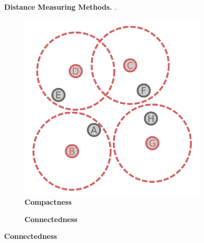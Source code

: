 \begin{figure}
\begin{adjustbox}{minipage=\dimexpr{}\fboxrule,fbox}
\begin{subfigure}[b]{0.475\textwidth}
        \end{subfigure}
    \end{adjustbox}
    \caption[Distance Measuring Methods]{\textbf{Distance Measuring Methods.} .}
    \label{fig:Distance}
\end{figure}

\blindtext

\begin{figure}
    \centering
    \begin{adjustbox}{minipage=\dimexpr{}\fboxrule,fbox}
        \begin{subfigure}[b]{0.475\textwidth}
            \caption[Compactness]{\textbf{Compactness}}
            \label{subfig:Compactness}            \includegraphics[width=\textwidth]{Graphics/Compactness.pdf}
        \end{subfigure}
        \hfill
        \begin{subfigure}[b]{0.475\textwidth}
            \caption[Connectedness]{\textbf{Connectedness}}

\end{subfigure}
\end{adjustbox}
\end{figure}
